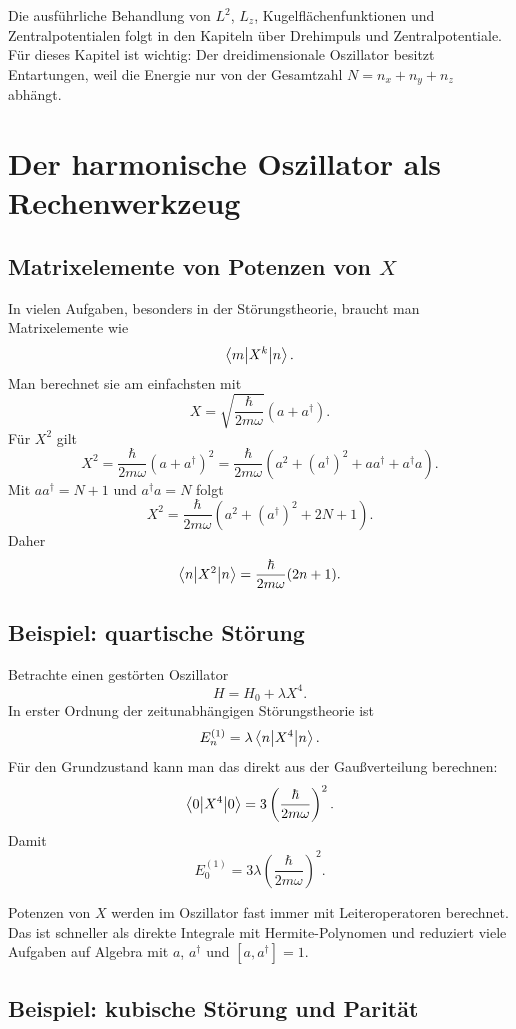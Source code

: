 \begin{notebox}
Die ausführliche Behandlung von $L^2$, $L_z$, Kugelflächenfunktionen und Zentralpotentialen folgt in den Kapiteln über Drehimpuls und Zentralpotentiale. Für dieses Kapitel ist wichtig: Der dreidimensionale Oszillator besitzt Entartungen, weil die Energie nur von der Gesamtzahl $N=n_x+n_y+n_z$ abhängt.
\end{notebox}

\section{Der harmonische Oszillator als Rechenwerkzeug}

\subsection{Matrixelemente von Potenzen von $X$}

In vielen Aufgaben, besonders in der Störungstheorie, braucht man Matrixelemente wie
\[
    \left\langle m\middle|X^k\middle|n\right\rangle.
\]
Man berechnet sie am einfachsten mit
\[
    X=\sqrt{\frac{\hbar}{2m\omega}}(a+a^\dagger).
\]
Für $X^2$ gilt
\[
    X^2=\frac{\hbar}{2m\omega}(a+a^\dagger)^2
    =\frac{\hbar}{2m\omega}\left(a^2+(a^\dagger)^2+aa^\dagger+a^\dagger a\right).
\]
Mit $aa^\dagger=N+1$ und $a^\dagger a=N$ folgt
\[
    X^2=\frac{\hbar}{2m\omega}\left(a^2+(a^\dagger)^2+2N+1\right).
\]
Daher
\[
    \left\langle n\middle|X^2\middle|n\right\rangle=\frac{\hbar}{2m\omega}(2n+1).
\]

\subsection{Beispiel: quartische Störung}

Betrachte einen gestörten Oszillator
\[
    H=H_0+\lambda X^4.
\]
In erster Ordnung der zeitunabhängigen Störungstheorie ist
\[
    E_n^{(1)}=\lambda\left\langle n\middle|X^4\middle|n\right\rangle.
\]
Für den Grundzustand kann man das direkt aus der Gaußverteilung berechnen:
\[
    \left\langle0\middle|X^4\middle|0\right\rangle=3\left(\frac{\hbar}{2m\omega}\right)^2.
\]
Damit
\[
    E_0^{(1)}=3\lambda\left(\frac{\hbar}{2m\omega}\right)^2.
\]

\begin{notebox}
Potenzen von $X$ werden im Oszillator fast immer mit Leiteroperatoren berechnet. Das ist schneller als direkte Integrale mit Hermite-Polynomen und reduziert viele Aufgaben auf Algebra mit $a$, $a^\dagger$ und $[a,a^\dagger]=1$.
\end{notebox}

\subsection{Beispiel: kubische Störung und Parität}

